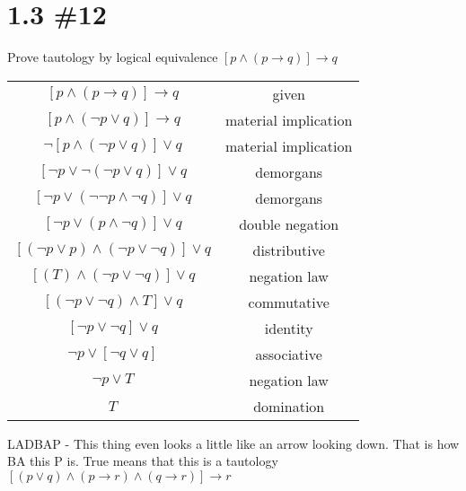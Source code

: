 \documentclass[h]{article}
\begin{document}
\section*{1.3 \#12}
Prove tautology by logical equivalence\newline
$[p \wedge (p \rightarrow q)] \rightarrow q $\newline
\begin{tabular}{|c c|}\hline
$[p \wedge (p \rightarrow q)] \rightarrow q $ & given \\ 
$[p \wedge (\neg p \vee q)] \rightarrow q $ & material implication \\
$\neg [p \wedge (\neg p \vee q)] \vee q $ & material implication \\
$ [\neg p \vee \neg (\neg p \vee q)] \vee q $ & demorgans \\
$ [\neg p \vee  (\neg \neg p \wedge \neg q)] \vee q $ & demorgans \\
$ [\neg p \vee  (p \wedge \neg q)] \vee q $ & double negation \\
$ [(\neg p \vee p) \wedge(\neg p \vee \neg q)] \vee q $ & distributive \\
$ [(T) \wedge(\neg p \vee \neg q)] \vee q $ & negation law \\
$ [(\neg p \vee \neg q) \wedge T] \vee q $ & commutative \\
$ [\neg p \vee \neg q] \vee q $ & identity \\
$ \neg p \vee [\neg q \vee q]$ & associative \\
$ \neg p \vee T $ & negation law \\
$ T $ & domination \\ \hline
\end{tabular}
\newline \newline
LADBAP - This thing even looks a little like an arrow looking down. That is how BA this P is. True means that this is a tautology
 \newline \newline
$[(p \vee q) \wedge (p \rightarrow r) \wedge (q \rightarrow r)] \rightarrow r$\newline
\end{document}
